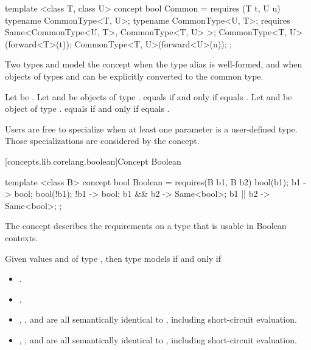 \begin{addedblock}
\begin{itemdecl}
template <class T, class U>
concept bool Common =
  requires (T t, U u) {
    typename CommonType<T, U>;
    typename CommonType<U, T>;
    requires Same<CommonType<U, T>, CommonType<T, U> >;
    CommonType<T, U>(forward<T>(t));
    CommonType<T, U>(forward<U>(u));
  };
\end{itemdecl}

\begin{itemdescr}
\pnum
Two types  and  model the  concept when the type
alias  is well-formed, and when objects of types 
and  can be explicitly converted to the common type.

\pnum
Let  be . Let  and  be objects
of type .  equals  if and only if
 equals
. Let  and  be
object of type .  equals  if and only if
 equals
.

\pnum
\enternote Users are free to specialize  when at least one parameter is a
user-defined type. Those specializations are considered by the  concept.\exitnote

\end{itemdescr}

[concepts.lib.corelang.boolean]{Concept Boolean}

%
\begin{itemdecl}
template <class B>
concept bool Boolean =
  requires(B b1, B b2) {
    bool(b1);
    { b1 } -> bool;
    bool(!b1);
    { !b1 } -> bool;
    { b1 && b2 } -> Same<bool>;
    { b1 || b2 } -> Same<bool>;
  };
\end{itemdecl}

\pnum
The  concept describes the requirements on a type that is usable in Boolean contexts.

\pnum
Given values  and  of type , then type  models
 if and only if

\begin{itemize}
\item {}.
\item {}.
\item {}, , and
       are all semantically identical to
      , including short-circuit evaluation.
\item {}, , and
       are all semantically identical to
      , including short-circuit evaluation.
\end{itemize}


\end{addedblock}
